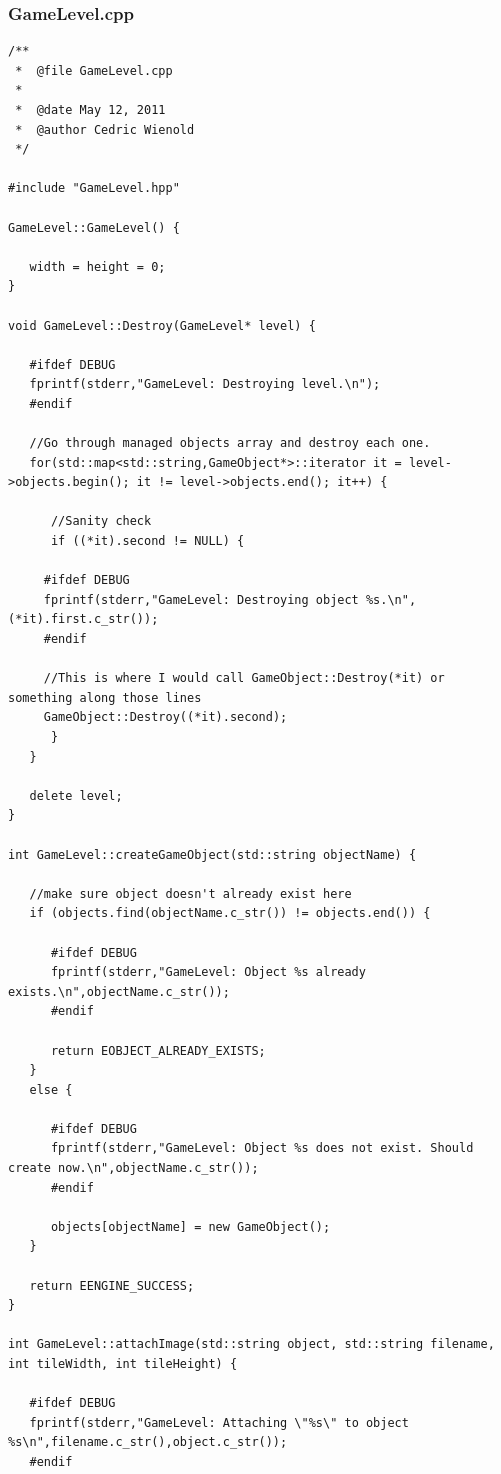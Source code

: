 \documentclass[12pt]{article}
\begin{document}
\subsubsection{GameLevel.cpp}
\begin{lstlisting}[breaklines]
/**
 *  @file GameLevel.cpp
 *
 *  @date May 12, 2011
 *  @author Cedric Wienold
 */

#include "GameLevel.hpp"

GameLevel::GameLevel() {
   
   width = height = 0;
}

void GameLevel::Destroy(GameLevel* level) {

   #ifdef DEBUG
   fprintf(stderr,"GameLevel: Destroying level.\n");
   #endif
   
   //Go through managed objects array and destroy each one.
   for(std::map<std::string,GameObject*>::iterator it = level->objects.begin(); it != level->objects.end(); it++) {
      
      //Sanity check
      if ((*it).second != NULL) {
	 
	 #ifdef DEBUG
	 fprintf(stderr,"GameLevel: Destroying object %s.\n",(*it).first.c_str());
	 #endif
   
	 //This is where I would call GameObject::Destroy(*it) or something along those lines
	 GameObject::Destroy((*it).second);
      }
   }
   
   delete level;
}

int GameLevel::createGameObject(std::string objectName) {

   //make sure object doesn't already exist here
   if (objects.find(objectName.c_str()) != objects.end()) {
      
      #ifdef DEBUG
      fprintf(stderr,"GameLevel: Object %s already exists.\n",objectName.c_str());
      #endif
      
      return EOBJECT_ALREADY_EXISTS;
   }
   else {

      #ifdef DEBUG
      fprintf(stderr,"GameLevel: Object %s does not exist. Should create now.\n",objectName.c_str());
      #endif
      
      objects[objectName] = new GameObject();
   }
   
   return EENGINE_SUCCESS;
}

int GameLevel::attachImage(std::string object, std::string filename, int tileWidth, int tileHeight) {
   
   #ifdef DEBUG
   fprintf(stderr,"GameLevel: Attaching \"%s\" to object %s\n",filename.c_str(),object.c_str());
   #endif
   

\end{lstlisting}
\end{document}
